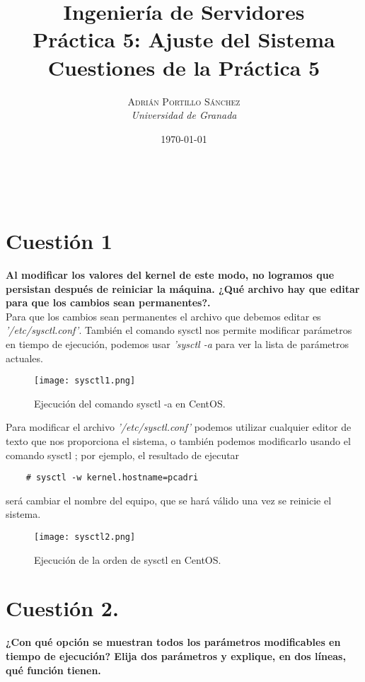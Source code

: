 \documentclass[a4paper, 10pt]{article} %
\title{\textbf{Ingeniería de Servidores\\Práctica 5: Ajuste del Sistema}\\ %
\vspace{20 pt}
Cuestiones de la Práctica 5} %
\author{\textsc{Adrián Portillo Sánchez} %
\\{\textit{Universidad de Granada}}} %
\date{\today} %
\makeatletter
\renewcommand{\maketitle}{ %
\begin{center} %
{\Huge\@title} %
\end{center}

\vspace{20pt} %

\begin{flushright} %
{\large\@author} %
\\\@date %

\vspace{40pt} %
\end{flushright}
\renewcommand{\baselinestretch}{0.5}

}
\makeatother
\begin{document}
\thispagestyle{empty}
\maketitle
\pagebreak
\thispagestyle{empty}
\tableofcontents
\pagebreak
\listoffigures
\pagebreak

\section{Cuestión 1}
\textbf{Al modificar los valores del kernel de este modo, no logramos que persistan después de reiniciar la máquina. ¿Qué archivo hay que editar para que los cambios sean permanentes?.}\\

Para que los cambios sean permanentes el archivo que debemos editar es \textit{'/etc/sysctl.conf'}. \cite{1}
También el comando sysctl nos permite modificar parámetros en tiempo de ejecución, podemos usar \textit{'sysctl -a} para ver la lista de parámetros actuales.

\begin{figure}[H]
\centering 
\texttt{[image: sysctl1.png]} 
\caption{Ejecución del comando sysctl -a en CentOS.} 
\label{contexto:figura} 
\end{figure}

Para modificar el archivo \textit{'/etc/sysctl.conf'} podemos utilizar cualquier editor de texto que nos proporciona el sistema, o también podemos modificarlo usando el comando sysctl ; por ejemplo, el resultado de ejecutar
\begin{verbatim}
    # sysctl -w kernel.hostname=pcadri
\end{verbatim}
será cambiar el nombre del equipo, que se hará válido una vez se reinicie el sistema.

\begin{figure}[H]
\centering 
\texttt{[image: sysctl2.png]} 
\caption{Ejecución de la orden de sysctl en CentOS.} 
\label{contexto:figura} 
\end{figure}

\pagebreak

\section{Cuestión 2.}
\textbf{¿Con qué opción se muestran todos los parámetros modificables en tiempo de ejecución? Elija dos parámetros y explique, en dos líneas, qué función tienen.}\\
\end{document}

